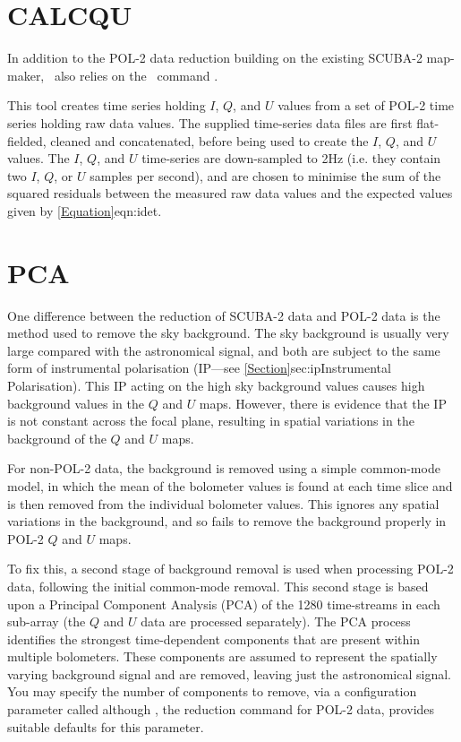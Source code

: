 \section{CALCQU}
\label{sec:calcqu}

In addition to the POL-2 data reduction building on the
existing SCUBA-2 map-maker, \poltwomap\ also relies on the \SMURF\
command \calcqu.

This  tool creates time series holding $I$,
$Q$, and $U$ values from a set of POL-2 time series holding raw data values.
The supplied time-series data files are first flat-fielded, cleaned and concatenated,
before being used to create the $I$, $Q$, and $U$ values. The $I$, $Q$,
and $U$ time-series are down-sampled to 2Hz (i.e. they contain two $I$, $Q$,
or $U$ samples per second),
and are chosen to minimise the sum of the squared residuals between the
measured raw data values and the expected values given by
\cref{Equation}{eqn:idet}{}.


\section{PCA}
\label{sec:pca}

One difference between the reduction of SCUBA-2 data and POL-2 data is the
method used to remove the sky background.  The sky background is usually
very large compared with the astronomical signal, and both are subject to
the same form of instrumental polarisation (IP---see
\cref{Section}{sec:ip}{Instrumental Polarisation}). This
IP acting on the high sky background values causes high background values
in the $Q$ and $U$ maps. However, there is evidence that the IP is not
constant across the focal plane, resulting in spatial variations in the
background of the $Q$ and $U$ maps.

For non-POL-2 data, the background is removed using a simple common-mode
model, in which the mean of the bolometer values is found at each time
slice and is then removed from the individual bolometer values. This
ignores any spatial variations in the background, and so fails to remove
the background properly in POL-2 $Q$ and $U$ maps.

To fix this, a second stage of background removal is used when processing
POL-2 data, following the initial common-mode removal. This second stage
is based upon a Principal Component Analysis (PCA) of the 1280
time-streams in each sub-array (the $Q$ and $U$ data are processed
separately). The PCA process identifies the strongest time-dependent
components that are present within multiple bolometers. These components
are assumed to represent the spatially varying background signal and are
removed, leaving just the astronomical signal. You may specify the number
of components to remove, via a \task{makemap} configuration
parameter called  although \poltwomap,
the reduction command for POL-2 data, provides suitable defaults for this parameter.

